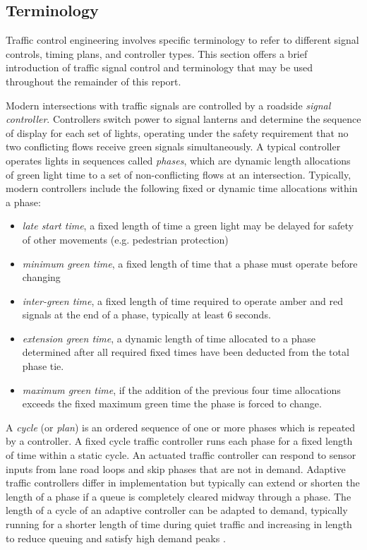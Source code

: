 \begin{appendices}

\chapter{Terminology}

Traffic control engineering involves specific terminology to refer to different signal controls, timing plans, and controller types. This section offers a brief introduction of traffic signal control and terminology that may be used throughout the remainder of this report.

Modern intersections with traffic signals are controlled by a roadside \emph{signal controller}. Controllers switch power to signal lanterns and determine the sequence of display for each set of lights, operating under the safety requirement that no two conflicting flows receive green signals simultaneously. A typical controller operates lights in sequences called \emph{phases}, which are dynamic length allocations of green light time to a set of non-conflicting flows at an intersection. Typically, modern controllers include the following fixed or dynamic time allocations within a phase:

\begin{itemize}
\item \emph{late start time}, a fixed length of time a green light may be delayed for safety of other movements (e.g. pedestrian protection)
\item \emph{minimum green time}, a fixed length of time that a phase must operate before changing
\item \emph{inter-green time}, a fixed length of time required to operate amber and red signals at the end of a phase, typically at least 6 seconds. 
\item \emph{extension green time}, a dynamic length of time allocated to a phase determined after all required fixed times have been deducted from the total phase tie. 
\item \emph{maximum green time}, if the addition of the previous four time allocations exceeds the fixed maximum green time the phase is forced to change. 
\end{itemize}

A \emph{cycle} (or \emph{plan}) is an ordered sequence of one or more phases which is repeated by a controller. A fixed cycle traffic controller runs each phase for a fixed length of time within a static cycle. An actuated traffic controller can respond to sensor inputs from lane road loops and skip phases that are not in demand. Adaptive traffic controllers differ in implementation but typically can extend or shorten the length of a phase if a queue is completely cleared midway through a phase. The length of a cycle of an adaptive controller can be adapted to demand, typically running for a shorter length of time during quiet traffic and increasing in length to reduce queuing and satisfy high demand peaks \cite{scatstraining}.


\end{appendices}

